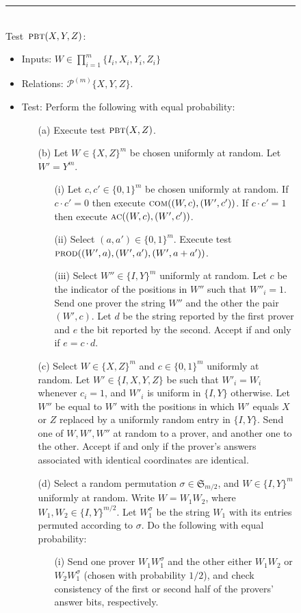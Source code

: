 \documentclass{toc}
\newcommand{\pbt}{\textsc{pbt}}
\newcommand{\prodt}{\textsc{prod}}
\newcommand{\comt}{\textsc{com}}
\newcommand{\act}{\textsc{ac}}
\newcommand{\paulin}{\mathcal{P}^{(m)}\!}
\begin{document}
\begin{figure}[H]
\rule[1ex]{\textwidth}{0.5pt}\\
\justifying
Test~$\pbt(X,Y,Z)$: 
\begin{itemize}
\item Inputs: $W\in\prod_{i=1}^m\{I_i,X_i,Y_i,Z_i\}$
\item Relations: $\paulin\{X,Y,Z\}$.  
\item Test: Perform the following with equal probability: 
\begin{enumerate}
\item[(a)] Execute test $\pbt(X,Z)$. 
\item[(b)] Let $W\in\{X,Z\}^m$ be chosen uniformly at random. Let $W'=Y^m$. 
\begin{enumerate}
\item[(i)] Let $c,c'\in\{0,1\}^m$ be chosen uniformly at random. If $c\cdot c'=0$ then execute $\comt((W,c),(W',c'))$. If $c\cdot c'=1$ then execute $\act((W,c),(W',c'))$. 
\item[(ii)]  Select $(a,a')\in\{0,1\}^m$. Execute test $\prodt((W',a),(W',a'),(W',a+a'))$. 
\item[(iii)] Select $W''\in\{I,Y\}^m$ uniformly at random. Let $c$ be the indicator of the positions in $W''$ such that $W''_i=1$. Send one prover the string $W''$ and the other the pair $(W',c)$. Let $d$ be the string reported by the first prover and $e$ the bit reported by the second. Accept if and only if $e=c\cdot d$. 
\end{enumerate}
\item[(c)] Select $W\in\{X,Z\}^m$ and $c\in\{0,1\}^m$ uniformly at random. Let $W'\in\{I,X,Y,Z\}$ be such that $W'_i=W_i$ whenever $c_i=1$, and $W'_i$ is uniform in $\{I,Y\}$ otherwise. Let $W''$ be equal to $W'$ with the positions in which $W'$ equals $X$ or $Z$ replaced by a uniformly random entry in $\{I,Y\}$. Send one of $W,W',W''$ at random to a prover, and another one to the other. Accept if and only if the prover's answers associated with identical coordinates are identical. 
\item[(d)] Select a random permutation  $\sigma \in \mathfrak{S}_{m/2}$, and $W\in  \{I,Y\}^m$ uniformly at random. Write $W=W_1 W_2$, where $W_1,W_2\in \{I,Y\}^{m/2}$. Let $W_1^\sigma$ be the string $W_1$ with its entries permuted according to $\sigma$. Do the following with equal probability: 
\begin{enumerate}
\item[(i)] Send one prover $W_1 W_1^\sigma$ and the other either $W_1 W_2$ or $W_2W_1^\sigma$ (chosen with probability $1/2$), and check consistency of the first or second half of the provers' answer bits, respectively.

\end{enumerate}
\end{enumerate}
\end{itemize}
\end{figure}
\end{document}
